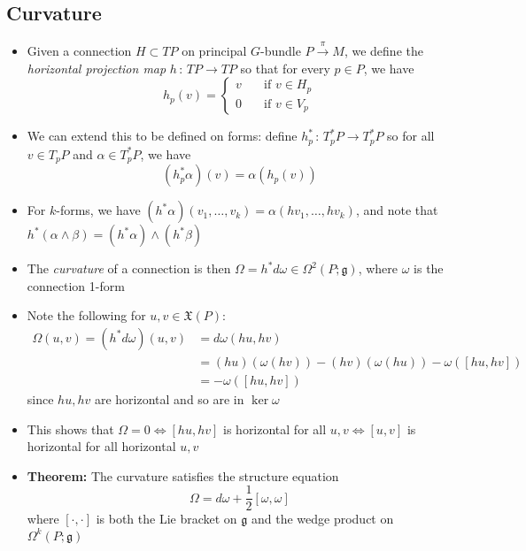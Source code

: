 \documentclass[12pt,a4paper]{article}
\numberwithin{equation}{section}
\begin{document}
	\subsection{Curvature}
	\begin{itemize}
		\item Given a connection $H\subset TP$ on principal $G$-bundle $P\xrightarrow{\pi}M$, we define the \textit{horizontal projection map} $h\,:\,TP\to TP$ so that for every $p\in P$, we have
		\begin{equation}
			h_{p}(v)=\begin{cases}v\quad&\text{if }v\in H_{p}\\0\quad&\text{if }v\in V_{p}\end{cases}
		\end{equation}
		\item We can extend this to be defined on forms: define $h^{*}_{p}\,:\,T_{p}^{*}P\to T_{p}^{*}P$ so for all $v\in T_{p}P$ and $\alpha\in T_{p}^{*}P$, we have
		\begin{equation}
			(h_{p}^{*}\alpha)(v)=\alpha(h_{p}(v))
		\end{equation}
		\item For $k$-forms, we have $(h^{*}\alpha)(v_{1},\ldots,v_{k})=\alpha(hv_{1},\ldots,hv_{k})$, and note that $h^{*}(\alpha\wedge\beta)=(h^{*}\alpha)\wedge(h^{*}\beta)$
		\item The \textit{curvature} of a connection is then $\Omega=h^{*}d\omega\in\Omega^{2}(P;\mathfrak{g})$, where $\omega$ is the connection 1-form
		\item Note the following for $u,v\in\mathfrak{X}(P)$:
		\begin{equation}
			\begin{aligned}
				\Omega(u,v)=(h^{*}d\omega)(u,v)&=d\omega(hu,hv)\\&=(hu)(\omega(hv))-(hv)(\omega(hu))-\omega([hu,hv])\\&=-\omega([hu,hv])
			\end{aligned}
		\end{equation}
		since $hu,hv$ are horizontal and so are in $\ker\omega$
		\item This shows that $\Omega=0\iff [hu,hv]$ is horizontal for all $u,v\iff [u,v]$ is horizontal for all horizontal $u,v$
		\item \textbf{Theorem:} The curvature satisfies the structure equation
		\begin{equation}
			\Omega=d\omega+\frac{1}{2}[\omega,\omega]
		\end{equation}
		where $[\cdot,\cdot]$ is both the Lie bracket on $\mathfrak{g}$ and the wedge product on $\Omega^{k}(P;\mathfrak{g})$

\end{itemize}
\end{document}
